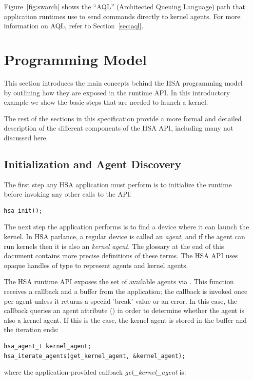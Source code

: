 \documentclass[final,oneside]{book}
\begin{document}
Figure~\ref{fig:swarch} shows the ``AQL'' (Architected Queuing
Language) path that application runtimes use to send commands directly to
kernel agents. For more information on AQL, refer to Section~\ref{sec:aql}.


\section{Programming Model}\label{sec:executionmodel}

This section introduces the main concepts behind the HSA programming model by
outlining how they are exposed in the runtime API. In this introductory example
we show the basic steps that are needed to launch a kernel.

The rest of the sections in this specification provide a more formal and
detailed description of the different components of the HSA API, including many
not discussed here.

\subsection{Initialization and Agent Discovery}
The first step any HSA application must perform is to initialize the runtime
before invoking any other calls to the API:
\begin{lstlisting}
hsa_init();
\end{lstlisting}
The next step the application performs is to find a device where it can launch
the kernel. In HSA parlance, a regular device is called an \emph{agent}, and
if the agent can run kernels then it is also an \emph{kernel agent}. The
glossary at the end of this document contains more precise definitions of these
terms. The HSA API uses opaque handles of type  to represent
agents and kernel agents.

The HSA runtime API exposes the set of available agents via
. This function receives a callback and a buffer from
the application; the callback is invoked once per agent unless it returns a
special 'break' value or an error. In this case, the callback queries an
agent attribute () in order to determine whether
the agent is also a kernel agent. If this is the case, the kernel agent
is stored in the buffer and the iteration ends:

\begin{lstlisting}
hsa_agent_t kernel_agent;
hsa_iterate_agents(get_kernel_agent, &kernel_agent);
\end{lstlisting}
where the application-provided callback \textit{get_kernel_agent} is:
\end{document}
